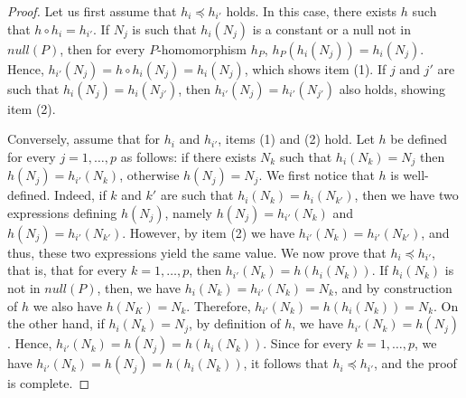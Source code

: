 \begin{proof}
    Let us first assume that $h_i \preceq h_{i'}$ holds.
    In this case, there exists $h$ such that $h \circ h_{i} = h_{i'}$.
    If $N_j$ is such that $h_i(N_j)$ is a constant or a null not in $null(P)$, then for every $P$-homomorphism $h_P$, $h_P(h_{i}(N_j))= h_{i}(N_j)$.
    Hence, $h_{i'}(N_j)= h \circ h_{i}(N_j) = h_{i}(N_j)$, which shows item (1).
    If $j$ and $j'$ are such that $h_i(N_j)= h_i(N_{j'})$, then $h_{i'}(N_j)= h_{i'}(N_{j'})$ also holds, showing item (2).

    Conversely, assume that for $h_i$ and $h_{i'}$, items (1) and (2) hold.
    Let $h$ be defined for every $j = 1, \ldots, p$ as follows: if there exists $N_k$ such that $h_i(N_k)=N_j$ then $h(N_j) = h_{i'}(N_k)$, otherwise $h(N_j)=N_j$.
    We first notice that $h$ is well-defined.
    Indeed, if $k$ and $k'$ are such that $h_i(N_k)=h_i(N_{k'})$, then we have two expressions defining $h(N_j)$, namely $h(N_j) = h_{i'}(N_k)$ and $h(N_j) = h_{i'}(N_{k'})$.
    However, by item (2) we have $h_{i'}(N_k)=h_{i'}(N_{k'})$, and thus, these two expressions yield the same value.
    We now prove that $h_{i} \preceq h_{i'}$, that is, that for every $k = 1, \ldots, p$, then $h_{i'}(N_k)=h(h_{i}(N_k))$.
    If $h_i(N_k)$ is not in $null(P)$, then, we have $h_i(N_k)=h_{i'}(N_k)=N_k$, and by construction of $h$ we also have $h(N_K)=N_k$.
    Therefore, $h_{i'}(N_k)=h(h_{i}(N_k))=N_k$.
    On the other hand, if $h_i(N_k)=N_j$, by definition of $h$, we have $h_{i'}(N_k)=h(N_j)$.
    Hence, $h_{i'}(N_k)=h(N_j)=h(h_i(N_k))$.
    Since for every $k = 1, \ldots, p$, we have $h_{i'}(N_k)=h(N_j)=h(h_i(N_k))$, it follows that $h_i \preceq h_{i'}$, and the proof is complete.
\end{proof}

